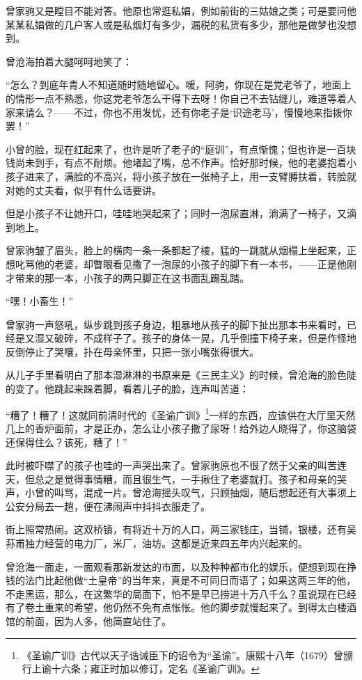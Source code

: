 \par 曾家驹又是瞠目不能对答。他原也常逛私娼，例如前街的三姑娘之类；可是要问他某某私娼做的几户客人或是私烟灯有多少，漏税的私货有多少，那他是做梦也没想到。
\par 曾沧海拍着大腿呵呵地笑了：
\par “怎么？到底年青人不知道随时随地留心。嗳，阿驹，你现在是党老爷了，地面上的情形一点不熟悉，你这党老爷怎么干得下去呀！你自己不去钻缝儿，难道等着人家来请么？——不过，你也不用发忧，还有你老子是‘识途老马’，慢慢地来指拨你罢！”
\par 小曾的脸，现在红起来了，也许是听了老子的“庭训”，有点惭愧；但也许是一百块钱尚未到手，有点不耐烦。他堵起了嘴，总不作声。恰好那时候，他的老婆抱着小孩子进来了，满脸的不高兴，将小孩子放在一张椅子上，用一支臂膊扶着，转脸就对她的丈夫看，似乎有什么话要讲。
\par 但是小孩子不让她开口，哇哇地哭起来了；同时一泡尿直淋，淌满了一椅子，又滴到地上。
\par 曾家驹皱了眉头，脸上的横肉一条一条都起了棱，猛的一跳就从烟榻上坐起来，正想叱骂他的老婆，却瞥眼看见撒了一泡尿的小孩子的脚下有一本书，——正是他刚才带来的那一本，小孩子的两只脚正在这书面乱踢乱踏。
\par “嘿！小畜生！”
\par 曾家驹一声怒吼，纵步跳到孩子身边，粗暴地从孩子的脚下扯出那本书来看时，已经是又湿又破碎，不成样子了。孩子的身体一晃，几乎倒撞下椅子来，但是作怪地反倒停止了哭嚷，扑在母亲怀里，只把一张小嘴张得很大。
\par 从儿子手里看明白了那本湿淋淋的书原来是《三民主义》的时候，曾沧海的脸色陡的变了。他跳起来跺着脚，看着儿子的脸，连声叫苦道：
\par “糟了！糟了！这就同前清时代的《圣谕广训》\footnote{《圣谕广训》古代以天子诰诫臣下的诏令为“圣谕”。康熙十八年（1679）曾颁行上谕十六条；雍正时加以修订，定名《圣谕广训》。}一样的东西，应该供在大厅里天然几上的香炉面前，才是正办，怎么让小孩子撒了尿呀！给外边人晓得了，你这脑袋还保得住么？该死，糟了！”
\par 此时被吓噤了的孩子也哇的一声哭出来了。曾家驹原也不很了然于父亲的叫苦连天，但总之是觉得事情糟，而且很生气，一手揪住了老婆就打。孩子和母亲的哭声，小曾的叫骂，混成一片。曾沧海摇头叹气，只顾抽烟，随后想起还有大事须上公安分局去一趟，便在沸闹声中抖抖衣服走了。
\par 街上照常热闹。这双桥镇，有将近十万的人口，两三家钱庄，当铺，银楼，还有吴荪甫独力经营的电力厂，米厂，油坊。这都是近来四五年内兴起来的。
\par 曾沧海一面走，一面观看那新发达的市面，以及种种都市化的娱乐，便想到现在挣钱的法门比起他做“土皇帝”的当年来，真是不可同日而语了；如果这两三年的他，不走黑运，那么，在这繁华的局面下，怕不是早已捞进十万八千么？虽说现在已经有了卷土重来的希望，他仍然不免有点怅怅。他的脚步就慢起来了。到得太白楼酒馆的前面，因为人多，他简直站住了。
